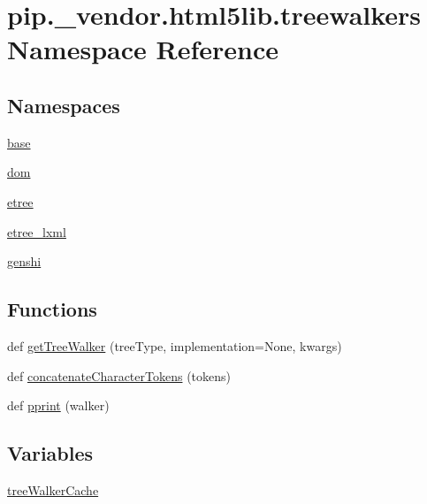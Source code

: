 \hypertarget{namespacepip_1_1__vendor_1_1html5lib_1_1treewalkers}{}\section{pip.\+\_\+vendor.\+html5lib.\+treewalkers Namespace Reference}
\label{namespacepip_1_1__vendor_1_1html5lib_1_1treewalkers}
\subsection*{Namespaces}
\begin{DoxyCompactItemize}
\item 
 \hyperlink{namespacepip_1_1__vendor_1_1html5lib_1_1treewalkers_1_1base}{base}
\item 
 \hyperlink{namespacepip_1_1__vendor_1_1html5lib_1_1treewalkers_1_1dom}{dom}
\item 
 \hyperlink{namespacepip_1_1__vendor_1_1html5lib_1_1treewalkers_1_1etree}{etree}
\item 
 \hyperlink{namespacepip_1_1__vendor_1_1html5lib_1_1treewalkers_1_1etree__lxml}{etree\+\_\+lxml}
\item 
 \hyperlink{namespacepip_1_1__vendor_1_1html5lib_1_1treewalkers_1_1genshi}{genshi}
\end{DoxyCompactItemize}
\subsection*{Functions}
\begin{DoxyCompactItemize}
\item 
def \hyperlink{namespacepip_1_1__vendor_1_1html5lib_1_1treewalkers_afd1e779f070509c261273bdf7b3028f4}{get\+Tree\+Walker} (tree\+Type, implementation=None, kwargs)
\item 
def \hyperlink{namespacepip_1_1__vendor_1_1html5lib_1_1treewalkers_aab9e4c5d1e598b631dc17cadf71c546e}{concatenate\+Character\+Tokens} (tokens)
\item 
def \hyperlink{namespacepip_1_1__vendor_1_1html5lib_1_1treewalkers_a97bbd349deba74525c5ede6f1db95596}{pprint} (walker)
\end{DoxyCompactItemize}
\subsection*{Variables}
\begin{DoxyCompactItemize}
\item 
\hyperlink{namespacepip_1_1__vendor_1_1html5lib_1_1treewalkers_a55d556756856eebe0f8e79ece5d07858}{tree\+Walker\+Cache}
\end{DoxyCompactItemize}


